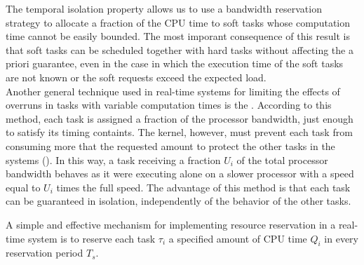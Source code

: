 
 The temporal isolation property allows us to use a bandwidth reservation strategy to allocate a fraction of the CPU time to soft tasks whose computation time cannot be easily bounded. The most imporant consequence of this result is that soft tasks can be scheduled together with hard tasks without affecting the a priori guarantee, even in the case in which the execution time of the soft tasks are not known or the soft requests exceed the expected load.\\
 Another general technique used in real-time systems for limiting the effects of overruns in tasks with variable computation times is the . According to this method, each task is assigned a fraction of the processor bandwidth, just enough to satisfy its timing containts. The kernel, however, must prevent each task from consuming more that the requested amount to protect the other tasks in the systems (). In this way, a task receiving a fraction $U_i$ of the total processor bandwidth behaves as it were executing alone on a slower processor with a speed equal to $U_i$ times the full speed. The advantage of this method is that each task can be guaranteed in isolation, independently of the behavior of the other tasks.

 A simple and effective mechanism for implementing resource reservation in a real-time system is to reserve each task $\tau_i$ a specified amount of CPU time $Q_i$ in every reservation period $T_s$.


